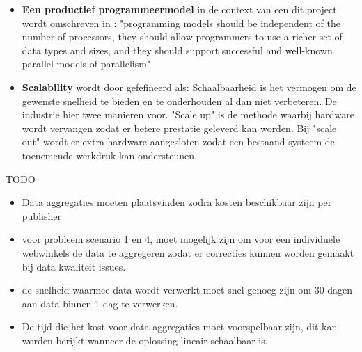 \begin{itemize}
    \item \textbf{Een productief programmeermodel} in de context van een dit project wordt omschreven in \textcite{asanovic2006landscape}: "programming models should be independent of the number of processors, they should allow programmers to use a richer set of data types and sizes, and they should support successful and well-known parallel models of parallelism"

    \item \textbf{Scalability} wordt door \textcite{dubey2005recognition} gefefineerd als: Schaalbaarheid is het vermogen om de gewenste snelheid te bieden en te onderhouden al dan niet verbeteren. De industrie hier twee manieren voor. "Scale up" is de methode waarbij hardware wordt vervangen zodat er betere prestatie geleverd kan worden. Bij "scale out" wordt er extra hardware aangesloten zodat een bestaand systeem de toenemende werkdruk kan ondersteunen.
\end{itemize}

TODO
\begin{itemize}
    \item Data aggregaties moeten plaatsvinden zodra kosten beschikbaar zijn per publisher
    
    \item voor probleem scenario 1 en 4, moet mogelijk zijn om voor een individuele webwinkels de data te aggregeren zodat er correcties kunnen worden gemaakt bij data kwaliteit issues. 
    \item de snelheid waarmee data wordt verwerkt moet snel genoeg zijn om 30 dagen aan data binnen 1 dag te verwerken.
    
    \item De tijd die het kost voor data aggregaties moet voorspelbaar zijn, dit kan worden berijkt  wanneer de oplossing lineair schaalbaar is.
\end{itemize}

